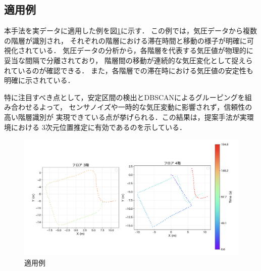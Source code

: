 \subsection{適用例}
本手法を実データに適用した例を図\ref{fig:move_between_floor}に示す．
この例では，気圧データから複数の階層が識別され，
それぞれの階層における滞在時間と移動の様子が明確に可視化されている．
気圧データの分析から，各階層を代表する気圧値が物理的に妥当な間隔で分離されており，
階層間の移動が連続的な気圧変化として捉えられているのが確認できる．
また，各階層での滞在時における気圧値の安定性も明確に示されている．

特に注目すべき点として，安定区間の検出とDBSCANによるグルーピングを組み合わせるよって，
センサノイズや一時的な気圧変動に影響されず，信頼性の高い階層識別が
実現できている点が挙げられる．この結果は，提案手法が実環境における
3次元位置推定に有効であるのを示している．


\begin{figure}[h]
	\centering
	\includegraphics[width=\linewidth]{image/move_between_floor.jpg}
	\caption{適用例}    \label{fig:move_between_floor}
\end{figure}

